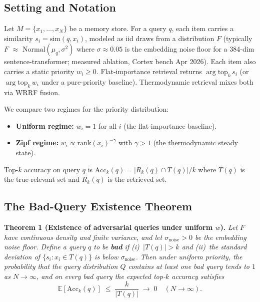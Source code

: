 \documentclass[11pt]{article}
\begin{document}
\subsection{Setting and Notation}
\label{app:erdos-setup}

Let $M = \{x_1, \dots, x_N\}$ be a memory store.  For a query $q$,
each item carries a similarity $s_i = \mathrm{sim}(q, x_i)$,
modeled as iid draws from a distribution $F$ (typically $F$
$\approx$ $\mathrm{Normal}(\mu_q, \sigma^2)$ where $\sigma \approx
0.05$ is the embedding noise floor for a 384-dim
sentence-transformer; measured ablation, Cortex bench Apr 2026).
Each item also carries a static priority $w_i \ge 0$.
Flat-importance retrieval returns $\arg\text{top}_k\, s_i$ (or
$\arg\text{top}_k\, w_i$ under a pure-priority baseline).
Thermodynamic retrieval mixes both via WRRF fusion.

We compare two regimes for the priority distribution:
\begin{itemize}
  \item \textbf{Uniform regime:} $w_i = 1$ for all $i$ (the
        flat-importance baseline).
  \item \textbf{Zipf regime:} $w_i \propto \mathrm{rank}(x_i)^{-\gamma}$
        with $\gamma > 1$ (the thermodynamic steady state).
\end{itemize}
Top-$k$ accuracy on query $q$ is
$\mathrm{Acc}_k(q) = |R_k(q) \cap T(q)| / k$ where $T(q)$ is the
true-relevant set and $R_k(q)$ is the retrieved set.

\subsection{The Bad-Query Existence Theorem}
\label{app:erdos-thm1}

\textbf{Theorem 1 (Existence of adversarial queries under uniform
$w$).}
\emph{Let $F$ have continuous density and finite variance, and let
$\sigma_{\mathrm{noise}} > 0$ be the embedding noise floor.  Define
a query $q$ to be \textbf{bad} if (i)~$|T(q)| > k$ and (ii)~the
standard deviation of $\{s_i : x_i \in T(q)\}$ is below
$\sigma_{\mathrm{noise}}$.  Then under uniform priority, the
probability that the query distribution $Q$ contains at least one
bad query tends to $1$ as $N \to \infty$, and on every bad query
the expected top-$k$ accuracy satisfies}
\begin{equation}
\mathbb{E}[\mathrm{Acc}_k(q)] \;\le\; \frac{k}{|T(q)|}
\;\to\; 0 \quad (N \to \infty).
\label{eq:thm1}
\end{equation}
\end{document}
